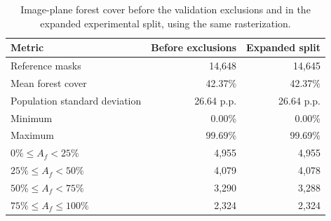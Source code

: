 \begin{table}[t]
\centering
\caption{Image-plane forest cover before the validation exclusions and in the expanded experimental split, using the same rasterization.}
\label{t4}
\begin{tabular}{|l|r|r|}
\hline
\textbf{Metric} & \textbf{Before exclusions} & \textbf{Expanded split} \\ \hline
Reference masks & 14,648 & 14,645 \\ \hline
Mean forest cover & 42.37\% & 42.37\% \\ \hline
Population standard deviation & 26.64 p.p. & 26.64 p.p. \\ \hline
Minimum & 0.00\% & 0.00\% \\ \hline
Maximum & 99.69\% & 99.69\% \\ \hline
$0\% \leq A_f < 25\%$ & 4,955 & 4,955 \\ \hline
$25\% \leq A_f < 50\%$ & 4,079 & 4,078 \\ \hline
$50\% \leq A_f < 75\%$ & 3,290 & 3,288 \\ \hline
$75\% \leq A_f \leq 100\%$ & 2,324 & 2,324 \\ \hline
\end{tabular}
\end{table}

\begin{table}[!t]
\centering
\caption{Top three fixed checkpoints by mean IoU on each screened external dataset.}
\label{t6}
\end{table}
